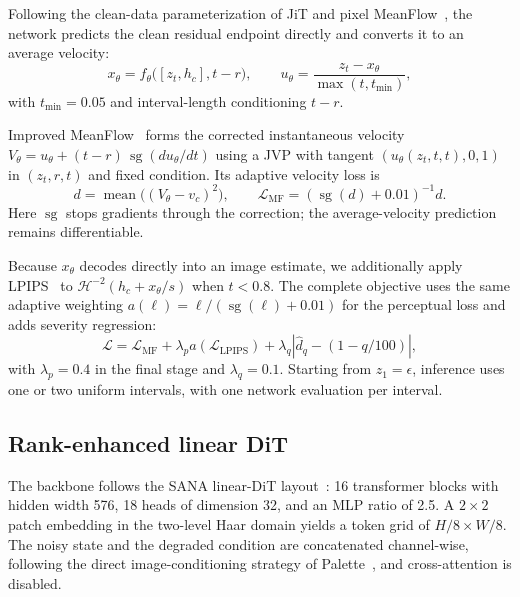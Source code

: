 \documentclass[conference,letterpaper]{IEEEtran}
\newcommand{\sg}{\operatorname{sg}}
\begin{document}
Following the clean-data parameterization of JiT and pixel MeanFlow~\cite{li2025jit,lu2026pixelmeanflow}, the network predicts the clean residual endpoint directly and converts it to an average velocity:
\begin{equation}
x_\theta=f_\theta\big([z_t,h_c],t-r\big),\qquad
u_\theta=\frac{z_t-x_\theta}{\max(t,t_{\min})},
\label{eq:xpred}
\end{equation}
with $t_{\min}=0.05$ and interval-length conditioning $t-r$.

Improved MeanFlow~\cite{geng2025improved} forms the corrected instantaneous velocity $V_\theta=u_\theta+(t-r)\,\sg(du_\theta/dt)$ using a JVP with tangent $(u_\theta(z_t,t,t),0,1)$ in $(z_t,r,t)$ and fixed condition. Its adaptive velocity loss is
\begin{equation}
d=\operatorname{mean}\big((V_\theta-v_c)^2\big),\qquad
\mathcal{L}_{\mathrm{MF}}=(\sg(d)+0.01)^{-1}d.
\end{equation}
Here $\sg$ stops gradients through the correction; the average-velocity prediction remains differentiable.

Because $x_\theta$ decodes directly into an image estimate, we additionally apply LPIPS~\cite{zhang2018lpips} to $\mathcal{H}^{-2}(h_c+x_\theta/s)$ when $t<0.8$.  The complete objective uses the same adaptive weighting $a(\ell)=\ell/(\sg(\ell)+0.01)$ for the perceptual loss and adds severity regression:
\begin{equation}
\mathcal{L}=\mathcal{L}_{\mathrm{MF}}+\lambda_p a(\mathcal{L}_{\mathrm{LPIPS}})
+\lambda_q\left|\hat{d}_q-(1-q/100)\right|,
\end{equation}
with $\lambda_p=0.4$ in the final stage and $\lambda_q=0.1$. Starting from $z_1=\epsilon$, inference uses one or two uniform intervals, with one network evaluation per interval.

\subsection{Rank-enhanced linear DiT}

The backbone follows the SANA linear-DiT layout~\cite{xie2024sana}: 16 transformer blocks with hidden width 576, 18 heads of dimension 32, and an MLP ratio of 2.5.  A $2\times2$ patch embedding in the two-level Haar domain yields a token grid of $H/8\times W/8$.  The noisy state and the degraded condition are concatenated channel-wise, following the direct image-conditioning strategy of Palette~\cite{saharia2022palette}, and cross-attention is disabled.
\end{document}

